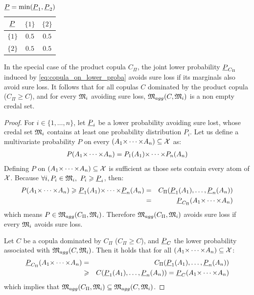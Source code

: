 \begin{table}[!ht]
    \centering
    \begin{tabular}{|c||c|c|}
        \hline
        \hspace{0.2cm} ${\underline{P}}$ \hspace{0.2cm} & \hspace{0.2cm} $\{1\}$ \hspace{0.2cm} & \hspace{0.2cm} $\{2\}$ \hspace{0.2cm} \\\hline\hline
        $\{1\}$ & $0.5$ & $0.5$ \\\hline
        $\{2\}$ & $0.5$ & $0.5$\\
        \hline
        \end{tabular}
        \caption{${\underline{P}} = \min({\underline{P}}_1, {\underline{P}}_2)$}
        \label{tab:non_coherent_lower}
\end{table}

In the special case of the product copula $C_\Pi$, the joint lower probability ${\underline{P}}_{C_\Pi}$ induced by \eqref{eq:copula_on_lower_proba} avoids sure loss if its marginals also avoid sure loss. It follows that for all copulas $C$ dominated by the product copula (\ie $C_\Pi\geqslant C$), and for every ${\mathfrak{M}}_i$ avoiding sure loss, ${\mathfrak{M}}_{agg}(C, {\mathfrak{M}}_i)$ is a non empty credal set.
\begin{proof}
    For $i\in\{1,\dots,n\}$, let ${\underline{P}}_i$ be a lower probability avoiding sure lost, \ie whose credal set ${\mathfrak{M}}_i$ contains at least one probability distribution $P_i$. Let us define a multivariate probability $P$ on every $(A_1{\times\dots\times} A_n)\subseteq{\mathcal{X}}$ as:
    \begin{eqnarray*}
        P(A_1{\times\dots\times} A_n) = P_1(A_1){\times\dots\times} P_n(A_n)
    \end{eqnarray*}
    Defining $P$ on $(A_1{\times\dots\times} A_n)\subseteq{\mathcal{X}}$ is sufficient as those sets contain every atom of ${\mathcal{X}}$.
    Because $\forall i, P_i\in{\mathfrak{M}}_i,~P_i\geqslant {\underline{P}}_i$, then:
    \begin{eqnarray*}
        P(A_1{\times\dots\times} A_n) \geqslant {\underline{P}}_1(A_1){\times\dots\times} {\underline{P}}_n(A_n) &=& C_\Pi({\underline{P}}_1(A_1), \dots, {\underline{P}}_n(A_n))\\
        &=& {\underline{P}}_{C_\Pi}(A_1{\times\dots\times} A_n)
    \end{eqnarray*}
which means $P\in{\mathfrak{M}}_{agg}(C_\Pi, {\mathfrak{M}}_i)$. Therefore ${\mathfrak{M}}_{agg}(C_\Pi, {\mathfrak{M}}_i)$ avoids sure loss if every ${\mathfrak{M}}_i$ avoids sure loss.

Let $C$ be a copula dominated by $C_\Pi$ (\ie $C_\Pi\geqslant C$), and ${\underline{P}}_C$ the lower probability associated with ${\mathfrak{M}}_{agg}(C, {\mathfrak{M}}_i)$. Then it holds that for all $(A_1{\times\dots\times} A_n)\subseteq{\mathcal{X}}$:
\begin{eqnarray*}
{\underline{P}}_{C_\Pi}(A_1{\times\dots\times} A_n)&=&C_\Pi({\underline{P}}_1(A_1), \dots, {\underline{P}}_n(A_n)) \\
    &\geqslant& C({\underline{P}}_1(A_1),\dots, {\underline{P}}_n(A_n)) = {\underline{P}}_C(A_1{\times\dots\times} A_n)
\end{eqnarray*}
which implies that ${\mathfrak{M}}_{agg}(C_\Pi, {\mathfrak{M}}_i)\subseteq {\mathfrak{M}}_{agg}(C, {\mathfrak{M}}_i)$.
\end{proof}

